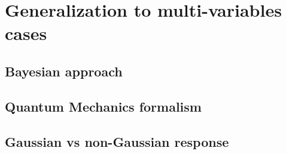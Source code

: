\section{Generalization to multi-variables cases}
\subsection{Bayesian approach}

\subsection{Quantum Mechanics formalism}

\subsection{Gaussian vs non-Gaussian response}

